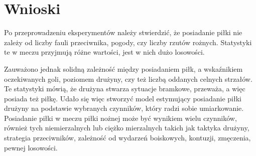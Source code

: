 \documentclass[11pt]{article}
\renewcommand{\thesection}{\Roman{section}}
\begin{document}
\section{Wnioski}

Po przeprowadzeniu eksperymentów należy stwierdzić, że posiadanie piłki nie zależy od liczby fauli przeciwnika, pogody, czy liczby rzutów rożnych. Statystyki te w meczu przyjmują różne wartości, jest w nich dużo losowości.

Zauważono jednak solidną zależność między posiadaniem piłk, a wskaźnikiem oczekiwanych goli, poziomem drużyny, czy też liczbą oddanych celnych strzałów. Te statystyki mówią, że drużyna stwarza sytuacje bramkowe, przeważa, a więc posiada też piłkę. Udało się więc stworzyć model estymujący posiadanie piłki drużyny na podstawie wybranych czynników, który radzi sobie umiarkowanie.
\newline
 Posiadanie piłki w meczu piłki nożnej może być wynikiem wielu czynników, również tych niemierzalnych lub ciężko mierzalnych takich jak taktyka drużyny, strategia przeciwników, zależność od wydarzeń boiskowych, kontuzji, zmęczenia, pewnej losowości.

\printbibliography[title={Bibliografia}]
\end{document}
